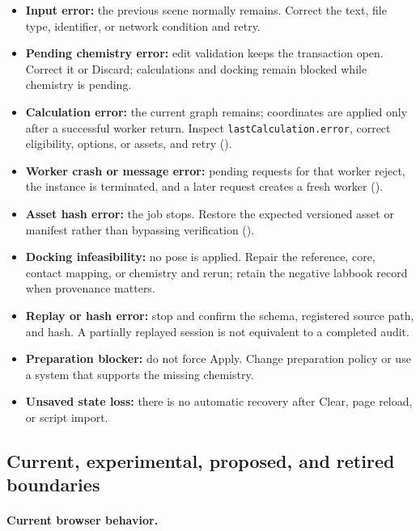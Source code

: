 \documentclass[11pt]{article}
\begin{document}
\begin{small}
\begin{itemize}[leftmargin=*]
\item \textbf{Input error:} the previous scene normally remains. Correct the text, file type, identifier, or network condition and retry.
\item \textbf{Pending chemistry error:} edit validation keeps the transaction open. Correct it or Discard; calculations and docking remain blocked while chemistry is pending.
\item \textbf{Calculation error:} the current graph remains; coordinates are applied only after a successful worker return. Inspect \texttt{lastCalculation.error}, correct eligibility, options, or assets, and retry ().
\item \textbf{Worker crash or message error:} pending requests for that worker reject, the instance is terminated, and a later request creates a fresh worker ().
\item \textbf{Asset hash error:} the job stops. Restore the expected versioned asset or manifest rather than bypassing verification ().
\item \textbf{Docking infeasibility:} no pose is applied. Repair the reference, core, contact mapping, or chemistry and rerun; retain the negative labbook record when provenance matters.
\item \textbf{Replay or hash error:} stop and confirm the schema, registered source path, and hash. A partially replayed session is not equivalent to a completed audit.
\item \textbf{Preparation blocker:} do not force Apply. Change preparation policy or use a system that supports the missing chemistry.
\item \textbf{Unsaved state loss:} there is no automatic recovery after Clear, page reload, or script import.
\end{itemize}

\subsection{Current, experimental, proposed, and retired boundaries}\label{appB:sec25}

\paragraph{Current browser behavior.}

\begin{itemize}[leftmargin=*]


\end{itemize}
\end{small}
\end{document}

